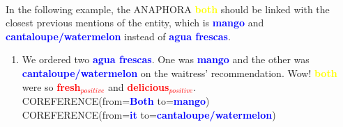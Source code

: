 \documentclass{article}
\begin{document}
\paragraph{}
In the following example, the ANAPHORA \textbf{\textcolor{yellow}{both}} should be linked with the closest previous mentions of the entity, which is \textbf{\textcolor{blue}{mango}} and \textbf{\textcolor{blue}{cantaloupe/watermelon}} instead of \textbf{\textcolor{blue}{agua frescas}}.

\begin{enumerate}[resume]
	\item We ordered two \textbf{\textcolor{blue}{agua frescas}}. One was  \textbf{\textcolor{blue}{mango}} and the other was 
	\textbf{\textcolor{blue}{cantaloupe/watermelon}} on the waitress' recommendation. Wow! 
	\textbf{\textcolor{yellow}{both}} were so 
	\textbf{\textcolor{red}{fresh$_{positive}$}} and 
	\textbf{\textcolor{red}{delicious$_{positive}$}}.
	\\
	

	\textsc{COREFERENCE}(from=\textbf{\textcolor{blue}{Both}} to=\textbf{\textcolor{blue}{mango}}) \\
	\textsc{COREFERENCE}(from=\textbf{\textcolor{blue}{it}} to=\textbf{\textcolor{blue}{cantaloupe/watermelon}}) \\
	
\end{enumerate}
\end{document}
